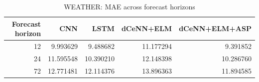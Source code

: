 \begin{table}
\caption{WEATHER: MAE across forecast horizons}
\begin{tabular}{rrrrr}
\toprule
Forecast horizon & CNN & LSTM & dCeNN+ELM & dCeNN+ELM+ASP \\
\midrule
12 & 9.993629 & 9.488682 & 11.177294 & 9.391852 \\
24 & 11.595548 & 10.390210 & 12.148398 & 10.286760 \\
72 & 12.771481 & 12.114376 & 13.896363 & 11.894585 \\
\bottomrule
\end{tabular}
\end{table}
